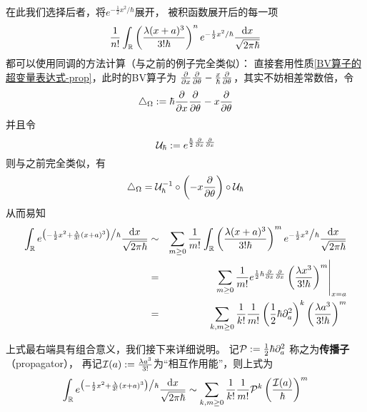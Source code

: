 在此我们选择后者，将$e^{-\frac{1}{2}x^2\big/\hbar}$展开，
被积函数展开后的每一项
$$
  \frac{1}{n!}
    \int_{\mathbb{R}}
      \left(
        \frac{\lambda (x+a)^3}{3!\hbar}
      \right)^n
      e^{-\frac{1}{2}x^2/\hbar}
      \frac{\mathrm{d} x}{\sqrt{2\pi\hbar}}
$$
都可以使用同调的方法计算（与之前的例子完全类似）：
直接套用性质\ref{BV算子的超变量表达式-prop}，此时的BV算子为
$\frac{\partial } {\partial x}\frac{\partial } {\partial \theta}-\frac{x}{\hbar}\frac{\partial } {\partial \theta}$，其实不妨相差常数倍，令
$$\triangle_{\Omega}:=\hbar\frac{\partial } {\partial x}\frac{\partial } {\partial \theta}-x\frac{\partial } {\partial \theta}$$
并且令
$$\mathcal{U}_{\hbar}:=e^{\frac{\hbar}{2}\frac{\partial } {\partial x}\frac{\partial } {\partial x}}$$
则与之前完全类似，有
$$\triangle_\Omega
=\mathcal{U}_\hbar^{-1}\circ
\left(-x\frac{\partial } {\partial \theta}\right)\circ\mathcal{U}_\hbar$$
从而易知
\begin{eqnarray*}
     \int_{\mathbb{R}}
       e^{\big(
            -\frac{1}{2}x^2
            +\frac{\lambda}{3!}(x+a)^3
          \big)
          \big/\hbar}
       \frac{\mathrm{d} x}{\sqrt{2\pi\hbar}}
&\sim&
     \sum_{m\geq 0}\frac{1}{m!}
       \int_{\mathbb{R}}
         \left(
           \frac{\lambda(x+a)^3}{3!\hbar}
         \right)^m
         e^{-\frac{1}{2}x^2\big/\hbar}
       \frac{\mathrm{d} x}{\sqrt{2\pi\hbar}}\\
&=&
     \left.
       \sum_{m\geq 0}\frac{1}{m!}
         e^{\frac{1}{2}\hbar\frac{\partial } {\partial x}\frac{\partial } {\partial x}}
         \left(
           \frac{\lambda x^3}{3!\hbar}
         \right)^m
     \right|_{x=a}\\
&=&
     \sum_{k,m\geq 0}
       \frac{1}{k!}
       \frac{1}{m!}
       \left(
         \frac{1}{2}\hbar\partial_a^2
       \right)^k
       \left(
         \frac{\lambda a^3}{3!\hbar}
       \right)^m
\end{eqnarray*}

上式最右端具有组合意义，我们接下来详细说明。
记$\mathcal{P}:=\frac{1}{2}\hbar\partial_{a}^2$
称之为\textbf{传播子}（propagator），
再记$\mathcal{I}(a):=\frac{\lambda a^3}{3!}$为“相互作用能”，则上式为
$$
     \int_{\mathbb{R}}
       e^{\big(
            -\frac{1}{2}x^2
            +\frac{\lambda}{3!}(x+a)^3
          \big)
          \big/\hbar}
       \frac{\mathrm{d} x}{\sqrt{2\pi\hbar}}
 \sim
     \sum_{k,m\geq 0}
       \frac{1}{k!}
       \frac{1}{m!}
       \mathcal{P}^k
       \left(
         \frac{\mathcal{I}(a)}{\hbar}
       \right)^m
$$

